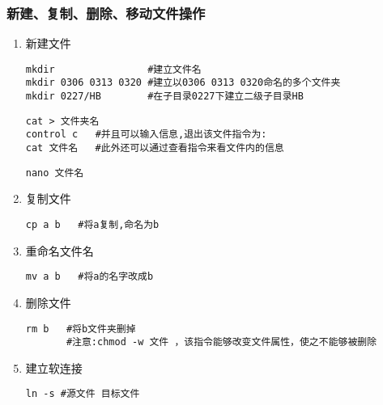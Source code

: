 \subsubsection{新建、复制、删除、移动文件操作}
\begin{enumerate}
    \item 新建文件

          \begin{lstlisting}
mkdir                #建立文件名
mkdir 0306 0313 0320 #建立以0306 0313 0320命名的多个文件夹
mkdir 0227/HB        #在子目录0227下建立二级子目录HB
\end{lstlisting}

          \begin{lstlisting}
cat > 文件夹名
control c   #并且可以输入信息,退出该文件指令为:
cat 文件名   #此外还可以通过查看指令来看文件内的信息
\end{lstlisting}

          \begin{lstlisting}
nano 文件名
\end{lstlisting}

    \item 复制文件

          \begin{lstlisting}
cp a b   #将a复制,命名为b
\end{lstlisting}

    \item 重命名文件名
          \begin{lstlisting}
mv a b   #将a的名字改成b
\end{lstlisting}

    \item 删除文件
          \begin{lstlisting}
rm b   #将b文件夹删掉
       #注意:chmod -w 文件 ，该指令能够改变文件属性，使之不能够被删除
\end{lstlisting}

    \item 建立软连接

          \begin{lstlisting}
ln -s #源文件 目标文件
\end{lstlisting}
\end{enumerate}

